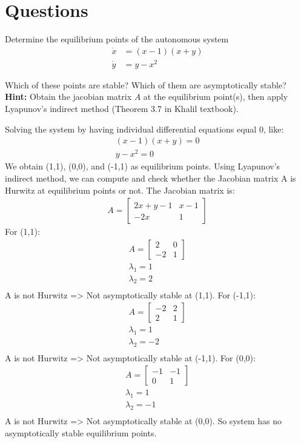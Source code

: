 \section{Questions}

\begin{problem}[20]
Determine the equilibrium points of the autonomous system
\begin{align*}
 \dot{x} &= (x-1)(x+y) \\
 \dot{y} &= y-x^2
\end{align*}

Which of these points are stable? Which of them are asymptotically stable? \textbf{Hint:} Obtain the jacobian matrix $A$ at the equilibrium point(s), then apply Lyapunov's indirect method (Theorem 3.7 in Khalil textbook).
\end{problem}

\begin{answer}
	Solving the system by having individual differential equations equal 0, like:
	\begin{align*}
	(x-1)(x+y)=0\\
	y-x^2=0
	\end{align*}
	We obtain (1,1), (0,0), and (-1,1) as equilibrium points. 
	Using Lyapunov's indirect method, we can compute and check whether the Jacobian matrix A is Hurwitz at equilibrium points or not.
	The Jacobian matrix is:
	\begin{align*}
	A = 
 \begin{bmatrix}
	2x+y-1 & x -1 \\
	-2x& 1
	\end{bmatrix}
	\end{align*}
	For (1,1):
	\begin{align*}
	A = 
\begin{bmatrix}
	2 & 0 \\
	-2& 1
	\end{bmatrix}\\
	\lambda_1 = 1\\
	\lambda_2 = 2\\
	\end{align*}
	A is not Hurwitz => Not asymptotically stable at (1,1).
	For (-1,1):
	\begin{align*}
	A =  \begin{bmatrix}
	-2 & 2 \\
	2& 1
	\end{bmatrix}\\
	\lambda_1 = 1\\
	\lambda_2 = -2\\
	\end{align*}
	A is not Hurwitz => Not asymptotically stable at (-1,1).
	For (0,0):
	\begin{align*}
	A =  \begin{bmatrix}
	-1 & -1 \\
	0& 1
	\end{bmatrix} \\
	\lambda_1 = 1\\
	\lambda_2 = -1\\
	\end{align*}
	A is not Hurwitz => Not asymptotically stable at (0,0).
	So system has no asymptotically stable equilibrium points.
\end{answer}

